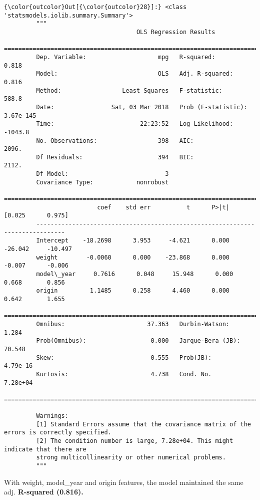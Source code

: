 \documentclass[11pt]{article}
\begin{document}
\begin{Verbatim}[commandchars=\\\{\}]
{\color{outcolor}Out[{\color{outcolor}28}]:} <class 'statsmodels.iolib.summary.Summary'>
         """
                                     OLS Regression Results                            
         ==============================================================================
         Dep. Variable:                    mpg   R-squared:                       0.818
         Model:                            OLS   Adj. R-squared:                  0.816
         Method:                 Least Squares   F-statistic:                     588.8
         Date:                Sat, 03 Mar 2018   Prob (F-statistic):          3.67e-145
         Time:                        22:23:52   Log-Likelihood:                -1043.8
         No. Observations:                 398   AIC:                             2096.
         Df Residuals:                     394   BIC:                             2112.
         Df Model:                           3                                         
         Covariance Type:            nonrobust                                         
         ==============================================================================
                          coef    std err          t      P>|t|      [0.025      0.975]
         ------------------------------------------------------------------------------
         Intercept    -18.2698      3.953     -4.621      0.000     -26.042     -10.497
         weight        -0.0060      0.000    -23.868      0.000      -0.007      -0.006
         model\_year     0.7616      0.048     15.948      0.000       0.668       0.856
         origin         1.1485      0.258      4.460      0.000       0.642       1.655
         ==============================================================================
         Omnibus:                       37.363   Durbin-Watson:                   1.284
         Prob(Omnibus):                  0.000   Jarque-Bera (JB):               70.548
         Skew:                           0.555   Prob(JB):                     4.79e-16
         Kurtosis:                       4.738   Cond. No.                     7.28e+04
         ==============================================================================
         
         Warnings:
         [1] Standard Errors assume that the covariance matrix of the errors is correctly specified.
         [2] The condition number is large, 7.28e+04. This might indicate that there are
         strong multicollinearity or other numerical problems.
         """
\end{Verbatim}
            
    With weight, model\_year and origin features, the model maintained the
same adj. \textbf{R-squared (0.816).}


    
    
    
    
\end{document}

